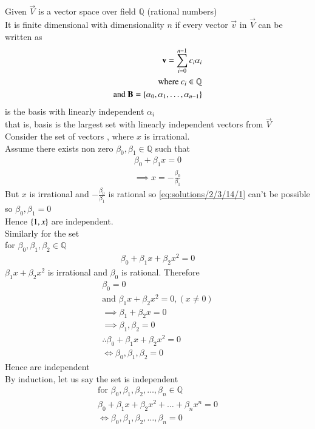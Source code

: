 Given $\vec{V}$ is a vector space over field $\mathbb{Q}$ (rational numbers)\\
It is finite dimensional with dimensionality $n$ if every vector $\vec{v}$ in $\vec{V}$ can be written as
\begin{align}
    \mathbf{v}=\sum_{i=0}^{n-1} c_i\alpha_i\\
    \text{where }c_i \in \mathbb{Q}\\
    \text{and } \mathbf{B}= \left\{\alpha_0,\alpha_1,\hdots,\alpha_{n-1} \right\}
\end{align}
is the basis with linearly independent $\alpha_i$\\
that is, basis is the largest set with linearly independent vectors from $\vec{V}$\\
Consider the set of vectors  , where $x$ is irrational.\\
Assume there exists non zero $\beta_0,\beta_1 \in \mathbb{Q}$ such that
\begin{align}
   \beta_0+\beta_1x=0 \\
   \implies x=-\frac{\beta_0}{\beta_1}\label{eq:solutions/2/3/14/1}
\end{align}
But $x$ is irrational and $-\frac{\beta_0}{\beta_1}$ is rational so \eqref{eq:solutions/2/3/14/1} can't be possible so $\beta_0,\beta_1=0$\\
Hence $\left\{1,x\right\}$ are independent.\\
Similarly for the set  \\
for  $\beta_0,\beta_1,\beta_2 \in \mathbb{Q}$
\begin{align}
  \beta_0+\beta_1x+\beta_2x^2=0  
\end{align}
$\beta_1x+\beta_2x^2$ is irrational and $\beta_0$ is rational. Therefore
\begin{align}
  \beta_0=0\label{eq:solutions/2/3/14/2}\\
  \text{and  } \beta_1x+\beta_2x^2=0,( x \neq 0)\label{eq:solutions/2/3/14/3}\\
  \implies \beta_1+\beta_2x=0  \\
  \implies \beta_1,\beta_2=0\\
  \therefore  \beta_0+\beta_1x+\beta_2x^2=0\\ \iff \beta_0,\beta_1,\beta_2=0
\end{align}
Hence  are independent \\
By induction, let us say the set  is independent
\begin{align}
\text{for  }\beta_0,\beta_1,\beta_2,\hdots,\beta_n \in \mathbb{Q}\\
    \beta_0+\beta_1x+\beta_2x^2+\hdots+\beta_nx^n=0 \label{eq:solutions/2/3/14/4}\\ \iff    \beta_0,\beta_1,\beta_2,\hdots,\beta_n=0
\end{align}
